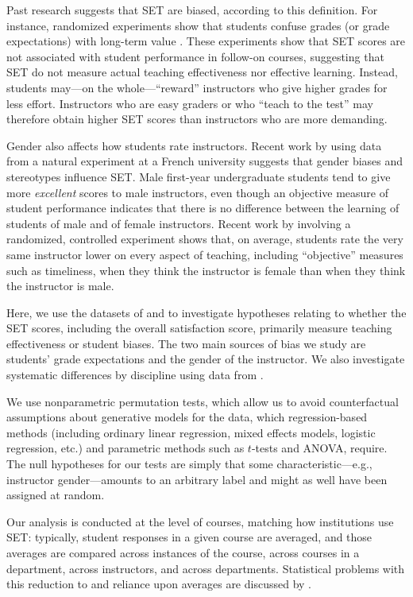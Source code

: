 \documentclass[12pt]{article}
\begin{document}
Past research suggests that SET are biased, according to this definition. 
For instance, randomized experiments show that students confuse grades (or grade expectations) with long-term value \citep{Carrell2010a,Braga2014}. 
These experiments show that SET scores are not associated with student performance in follow-on courses, suggesting that SET do not measure actual teaching effectiveness nor effective learning. 
Instead, students may---on the whole---``reward'' instructors who give higher grades for
less effort. 
Instructors who are easy graders or who ``teach to the test'' may therefore obtain higher SET scores
than instructors who are more demanding.    

Gender also affects how students rate instructors.
Recent work by \citet{Boring2015} using data from a natural experiment at a French university
suggests that gender biases and stereotypes influence SET. 
Male first-year undergraduate students tend to give more \textit{excellent} scores to male instructors,
even though an objective measure of student performance indicates that there is no difference between
the learning of students of male and of female instructors.
Recent work by \citet{MacNell2014} involving a randomized, controlled experiment shows that, on average, students rate the very same instructor lower on every aspect of teaching,
including ``objective'' measures such as timeliness, when they think the instructor is 
female than when they think the instructor is male. 

Here, we use the datasets of \citet{Boring2015} and \citet{MacNell2014} to investigate 
hypotheses relating to whether the SET scores, including the overall satisfaction score, 
primarily measure teaching effectiveness or student biases. 
The two main sources of bias we study are students' grade expectations and the gender of the 
instructor. 
We also investigate systematic differences by discipline using data from \citet{Boring2015}.

We use nonparametric permutation tests, which allow us to avoid counterfactual assumptions about
generative models for the data, which regression-based methods (including
ordinary linear regression, mixed effects models, logistic regression, etc.) and parametric
methods such as $t$-tests and ANOVA, require.
The null hypotheses for our tests are simply that some 
characteristic---e.g., instructor gender---amounts to an arbitrary label and might as well
have been assigned at random. 

Our analysis is conducted at the level of courses, matching how institutions use SET: 
typically, student responses in a given course
are averaged, and those averages are compared across instances of the course,
across courses in a department, across instructors, and across departments.
Statistical problems with this reduction to and reliance upon averages are 
discussed by \citet{StarkFreishtat2014}.
\end{document}
